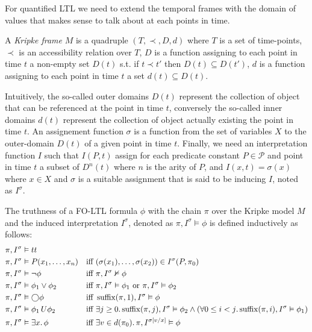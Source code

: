 For quantified LTL we need to extend the temporal frames with the domain of values that makes sense to talk about at
each points in time.

\begin{definition}
  A \emph{Kripke frame} $M$ is a quadruple $(T, \prec, D, d)$ where $T$ is a set of time-points, $\prec$ is an
  accessibility relation over $T$, $D$ is a function assigning to each point in time $t$ a non-empty set $D(t)$ s.t.
  if $t \prec t'$ then $D(t) \subseteq D(t')$, $d$ is a function assigning to each point in time $t$ a set $d(t)
  \subseteq D(t)$.
\end{definition}
Intuitively, the so-called outer domains $D(t)$ represent the collection of object that can be referenced at the point
in time $t$, conversely the so-called inner domains $d(t)$ represent the collection of object actually existing the
point in time $t$. An assignement function $\sigma$ is a function from the set of variables $X$ to the outer-domain
$D(t)$ of a given point in time $t$. Finally, we need an interpretation function $I$ such that $I(P, t)$ assign for each
predicate constant $P \in \mathcal{P}$ and point in time $t$ a subset of $D^n(t)$ where $n$ is the arity of $P$, and
$I(x, t) = \sigma(x)$ where $x \in X$ and $\sigma$ is a suitable assignment that is said to be inducing $I$, noted as
$I^\sigma$.

\begin{definition}
  The truthness of a FO-LTL formula $\phi$ with the chain $\pi$ over the Kripke model $M$ and the induced
  interpretation $I^\sigma$, denoted as $\pi, I^\sigma \vDash \phi$ is defined inductively as follows:
  \begin{align*}
    \pi, I^\sigma &\vDash tt && \\
    \pi, I^\sigma &\vDash P(x_1, \ldots, x_n) &&\text{iff } (\sigma(x_1), \ldots, \sigma(x_2)) \in I^\sigma(P, \pi_0) \\
    \pi, I^\sigma &\vDash \neg\phi &&\text{iff } \pi, I^\sigma \nvDash \phi \\
    \pi, I^\sigma &\vDash \phi_1 \lor \phi_2 &&\text{iff } \pi, I^\sigma \vDash \phi_1 \text{ or } \pi, I^\sigma
      \vDash \phi_2 \\
    \pi, I^\sigma &\vDash \bigcirc{\phi} &&\text{iff } \operatorname{suffix}(\pi, 1), I^\sigma \vDash \phi \\
    \pi, I^\sigma &\vDash {\phi_1}\,U {\phi_2} &&\text{iff } \exists {j \geq 0} \ldotp {\operatorname{suffix}(\pi, j), I^\sigma \vDash \phi_2 \land
      (\forall {0 \leq i < j} \ldotp {\operatorname{suffix}(\pi, i), I^\sigma \vDash \phi_1})} \\
    \pi, I^\sigma &\vDash \exists {x} \ldotp {\phi} &&\text{iff } \exists {v \in d(\pi_0)} \ldotp {\pi, I^{\sigma[v/x]} \vDash \phi} \\
  \end{align*}
\end{definition}

